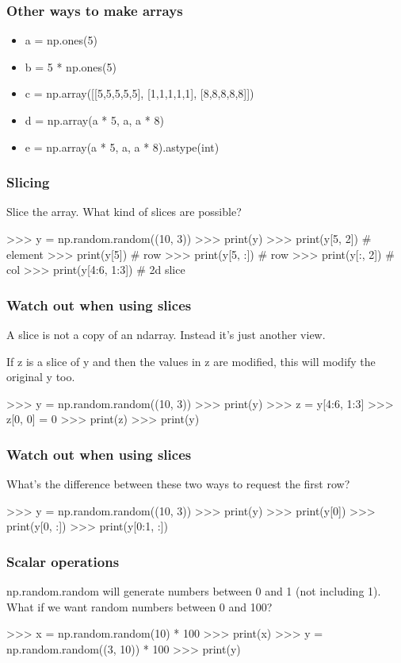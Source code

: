 \documentclass{beamer}
\begin{document}
\begin{frame}[fragile]
\frametitle{Other ways to make arrays}
\begin{itemize}
\item a = np.ones(5)
\pause
\item b = 5 * np.ones(5)
\pause
\item c = np.array([[5,5,5,5,5], [1,1,1,1,1], [8,8,8,8,8]])
\pause 
\item d = np.array(a * 5, a, a * 8)
\pause
\item e = np.array(a * 5, a, a * 8).astype(int)
\end{itemize}
\end{frame}

\begin{frame}[fragile]
\frametitle{Slicing}
Slice the array. What kind of slices are possible?
\begin{code}
>>> y = np.random.random((10, 3))
>>> print(y)
>>> print(y[5, 2])   # element
>>> print(y[5])    # row
>>> print(y[5, :])    # row
>>> print(y[:, 2])    # col
>>> print(y[4:6, 1:3])   # 2d slice
\end{code}
\end{frame}



\begin{frame}[fragile]
\frametitle{Watch out when using slices}
A slice is not a copy of an ndarray. Instead it's just another view.

\bigskip

If z is a slice of y and then the
values in z are modified, this will modify the original y too.

\begin{code}
>>> y = np.random.random((10, 3))
>>> print(y)
>>> z = y[4:6, 1:3]
>>> z[0, 0] = 0
>>> print(z)
>>> print(y)
\end{code}
\end{frame}


\begin{frame}[fragile]
\frametitle{Watch out when using slices}
What's the difference between these two ways to request the first row?
\begin{code}
>>> y = np.random.random((10, 3))
>>> print(y)
>>> print(y[0])
>>> print(y[0, :])
>>> print(y[0:1, :])
\end{code}
\end{frame}

\begin{frame}[fragile]
\frametitle{Scalar operations}
np.random.random will generate numbers between 0 and 1 (not including
1). What if we want random numbers between 0 and 100?
\begin{code}
>>> x = np.random.random(10) * 100
>>> print(x)
>>> y = np.random.random((3, 10)) * 100
>>> print(y)
\end{code}
\end{frame}
\end{document}
